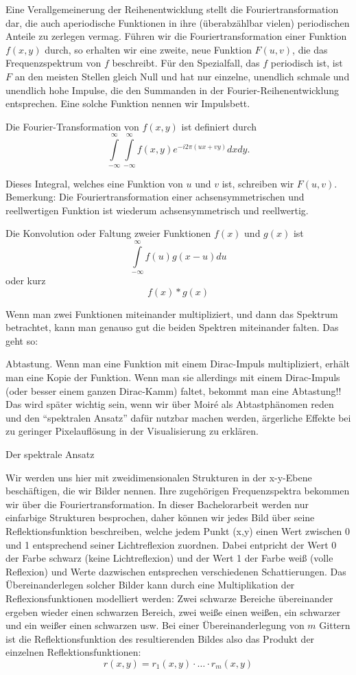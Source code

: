 \documentclass[a4paper]{article}
\begin{document}
Eine Verallgemeinerung der Reihenentwicklung stellt die Fouriertransformation dar, die auch aperiodische Funktionen in ihre (überabzählbar vielen) periodischen Anteile zu zerlegen vermag. Führen wir die Fouriertransformation einer Funktion $f(x,y)$ durch, so erhalten wir eine zweite, neue Funktion $F(u,v)$, die das Frequenzspektrum von $f$ beschreibt. Für den Spezialfall, das $f$ periodisch ist, ist $F$ an den meisten Stellen gleich Null und hat nur einzelne, unendlich schmale und unendlich hohe Impulse, die den Summanden in der Fourier-Reihenentwicklung entsprechen. Eine solche Funktion nennen wir Impulsbett.

Die Fourier-Transformation von $f(x,y)$ ist definiert durch $$\int\limits_{-\infty}^{\infty}\int\limits_{-\infty}^{\infty}f(x,y)e^{-i2\pi (ux+vy)}dxdy.$$

Dieses Integral, welches eine Funktion von $u$ und $v$ ist, schreiben wir $F(u,v)$. Bemerkung: Die Fouriertransformation einer achsensymmetrischen und reellwertigen Funktion ist wiederum achsensymmetrisch und reellwertig.

Die Konvolution oder Faltung zweier Funktionen $f(x)$ und $g(x)$ ist $$\int\limits_{-\infty}^{\infty}f(u)g(x-u)du$$ oder kurz $$f(x) * g(x)$$


Wenn man zwei Funktionen miteinander multipliziert, und dann das Spektrum betrachtet, kann man genauso gut die beiden Spektren miteinander falten. Das geht so: 

Abtastung. Wenn man eine Funktion mit einem Dirac-Impuls multipliziert, erhält man eine Kopie der Funktion. Wenn man sie allerdings mit einem Dirac-Impuls (oder besser einem ganzen Dirac-Kamm) faltet, bekommt man eine Abtastung!!
Das wird später wichtig sein, wenn wir über Moiré als Abtastphänomen reden und den “spektralen Ansatz” dafür nutzbar machen werden, ärgerliche Effekte bei zu geringer Pixelauflösung in der Visualisierung zu erklären.

Der spektrale Ansatz

Wir werden uns hier mit zweidimensionalen Strukturen in der x-y-Ebene beschäftigen, die wir Bilder nennen. Ihre zugehörigen Frequenzspektra bekommen wir über die Fouriertransformation.
In dieser Bachelorarbeit werden nur einfarbige Strukturen besprochen, daher können wir jedes Bild über seine Reflektionsfunktion beschreiben, welche jedem Punkt (x,y) einen Wert zwischen 0 und 1 entsprechend seiner Lichtreflexion zuordnen. Dabei entpricht der Wert 0 der Farbe schwarz (keine Lichtreflexion) und der Wert 1 der Farbe weiß (volle Reflexion) und Werte dazwischen entsprechen verschiedenen Schattierungen. Das Übereinanderlegen solcher Bilder kann durch eine Multiplikation der Reflexionsfunktionen modelliert werden: Zwei schwarze Bereiche übereinander ergeben wieder einen schwarzen Bereich, zwei weiße einen weißen, ein schwarzer und ein weißer einen schwarzen usw.
Bei einer Übereinanderlegung von $m$ Gittern ist die Reflektionsfunktion des resultierenden Bildes also das Produkt der einzelnen Reflektionsfunktionen:
$$r(x,y)=r_1(x,y)\cdot \ldots \cdot r_m(x,y)$$
\end{document}
